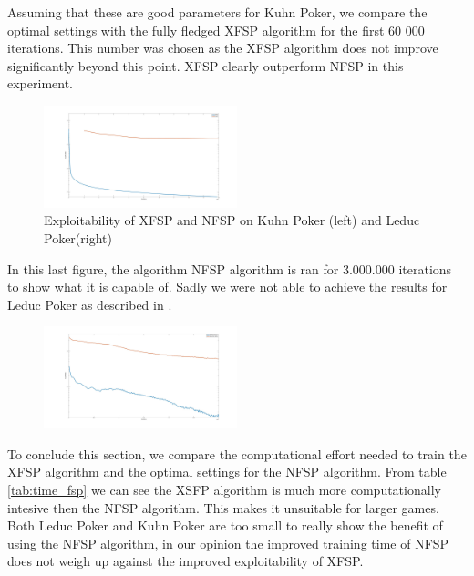 \documentclass[10pt,a4paper]{article}
\begin{document}
Assuming that these are good parameters for Kuhn Poker, we compare the optimal settings with the fully fledged XFSP algorithm for the first 60 000 iterations. This number was chosen as the XFSP algorithm does not improve significantly beyond this point. XFSP clearly outperform NFSP in this experiment.

\begin{figure}[h]
\centering
\label{fig:layers_kuhn}
\includegraphics[width=0.5\textwidth]{Figures/kuhn_xfsp_nfsp.jpg}
\caption{Exploitability of XFSP and NFSP on Kuhn Poker (left) and Leduc Poker(right)}
\end{figure}

In this last figure, the algorithm NFSP algorithm is ran for 3.000.000 iterations to show what it is capable of. Sadly we were not able to achieve the results for Leduc Poker as described in \cite{heinrichphd}.

\begin{center}
\begin{figure}[h]
\label{fig:full_run_nfsp}
\centering
\includegraphics[width=0.5\textwidth]{Figures/nfsp_full_run.jpg}
\end{figure}
\end{center}

To conclude this section, we compare the computational effort needed to train the XFSP algorithm and the optimal settings for the NFSP algorithm. From table \ref{tab:time_fsp} we can see the XSFP algorithm is much more computationally intesive then the NFSP algorithm. This makes it unsuitable for larger games. Both Leduc Poker and Kuhn Poker are too small to really show the benefit of using the NFSP algorithm, in our opinion the improved training time of NFSP does not weigh up against the improved exploitability of XFSP.
\end{document}
